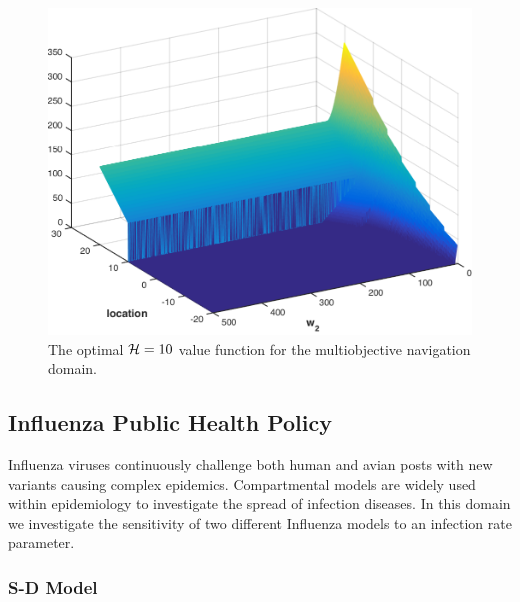 \begin{figure}[h!]
    \centering
    \includegraphics[width=\linewidth, height=0.8\linewidth]{images/robot1d}
    \caption{The optimal $ \mathcal{H} = 10 $ value function for the multiobjective navigation domain. }
    \label{fig:vehicle1d}
\end{figure}

\subsection{Influenza Public Health Policy}
\label{sec:results_influenza}

Influenza viruses continuously challenge both human and avian posts with new variants causing complex epidemics. Compartmental models are widely used within epidemiology to investigate the spread of infection diseases. In this domain we investigate the sensitivity of two different Influenza models to an infection rate parameter. 

\subsubsection{S-D Model}

